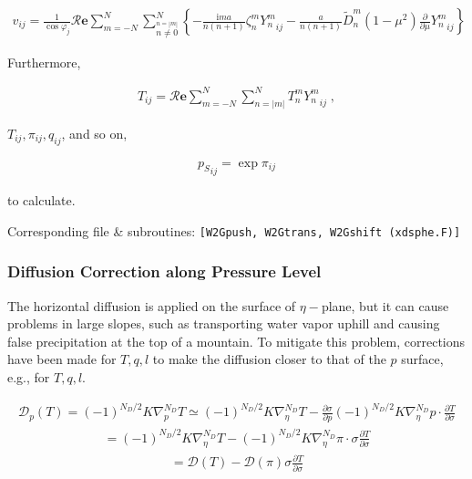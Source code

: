 \begin{eqnarray}
  v_{ij}
  =  \frac{1}{\cos \varphi_j}
     {\mathcal R}{\mathbf{e}} \sum_{m=-N}^{N}
                       \sum_{\stackrel{n=|m|}{n \neq 0}}^{N}
    \left\{
          -  \frac{\mathrm{i}m a}{n(n+1)} \zeta_n^m  {Y_n^m}_{ij}
          -  \frac{a}{n(n+1)} \tilde{D}_n^m
            (1-\mu^{2}) \frac{\partial{}}{\partial {\mu}} {Y_n^m}_{ij}
    \right\}
\end{eqnarray}

Furthermore,

\begin{eqnarray}
  T_{ij}
   =  {\mathcal R}{\mathbf{e}} \sum_{m=-N}^{N} \sum_{n=|m|}^{N}
      T_n^m  {Y_n^m}_{ij} \; ,
\end{eqnarray}

\(T_{ij}, \pi_{ij}, q_{ij}\), and so on,

\begin{eqnarray}
  {p_S}_{ij} = \exp \pi_{ij}
\end{eqnarray}

to calculate.

Corresponding file \& subroutines: \texttt{{[}W2Gpush,\ W2Gtrans,\ W2Gshift\ (xdsphe.F){]}}

\hypertarget{diffusion-correction-along-pressure-level}{%
\subsubsection{Diffusion Correction along Pressure Level}\label{diffusion-correction-along-pressure-level}}

The horizontal diffusion is applied on the surface of \(\eta-\)plane, but it can cause problems in large slopes, such as transporting water vapor uphill and causing false precipitation at the top of a
mountain. To mitigate this problem, corrections have been made for \(T,q,l\) to make the diffusion closer to that of the \(p\) surface, e.g., for \(T,q,l\).

\begin{eqnarray}
  {\mathcal D}_p (T) = (-1)^{N_D/2} K \nabla^{N_D}_p T  
                \simeq  (-1)^{N_D/2} K \nabla^{N_D}_{\eta} T  
                      - \frac{\partial{\sigma}}{\partial {p}}
                      (-1)^{N_D/2} K \nabla^{N_D}_{\eta} p
                      \cdot \frac{\partial{T}}{\partial {\sigma}}
\end{eqnarray} \begin{eqnarray}
                =      (-1)^{N_D/2} K \nabla^{N_D}_{\eta} T  
                    -  (-1)^{N_D/2} K \nabla^{N_D}_{\eta} \pi
                          \cdot \sigma \frac{\partial{T}}{\partial {\sigma}}
\end{eqnarray} \begin{eqnarray}
                =    {\mathcal D} (T)
                    -  {\mathcal D} (\pi)
                       \sigma \frac{\partial{T}}{\partial {\sigma}}
\end{eqnarray}

